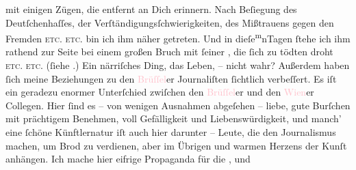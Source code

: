                mit einigen  Zügen, die entfernt an Dich erinnern. Nach Beſiegung des Deutſchenhaſſes, der
               Verſtändigungsſchwierigkeiten, des Mißtrauens gegen den Fremden \textsc{etc. etc.} bin ich ihm näher getreten. Und in dieſe\substVorne{}\textsuperscript{m}\substDazwischen{}n\substHinten{}{ }{\pb}Tagen ſtehe ich ihm rathend zur Seite bei einem
               großen Bruch mit ſeiner \label{K_L02669-2v}\label{K_L02669-2h}, die ſich zu
               tödten droht \textsc{etc. etc.} (ſiehe \label{K_L02669-4v}\label{K_L02669-4h}.) Ein närriſches Ding, das Leben, – nicht
               wahr? Außerdem haben ſich meine Beziehungen zu den \textcolor{pink}{Brüſſel}{}\ledrightnote{\textcolor{pink}{Brüssel}}er Journaliſten ſichtlich verbeſſert. Es iſt ein geradezu enormer
               Unterſchied zwiſchen den \textcolor{pink}{Brüſſel}{}\ledrightnote{\textcolor{pink}{Brüssel}}er und den \textcolor{pink}{Wien}{}\ledrightnote{\textcolor{pink}{Wien}}er Collegen. Hier ſind es – von wenigen
               Ausnahmen abgeſehen – liebe, gute Burſchen mit prächtigem Benehmen, voll Gefälligkeit
               und Liebenswürdigkeit, und manch’ eine ſchöne Künftlernatur iſt auch hier darunter –
               Leute, die den Journalismus machen, um Brod zu verdienen, aber im Übrigen \label{K_L02669-5v}\label{K_L02669-5h}
               und warmen Herzens der Kunſt anhängen. Ich mache hier eifrige Propaganda für die
                  \label{K_L02669-11v}\label{K_L02669-11h}, und

